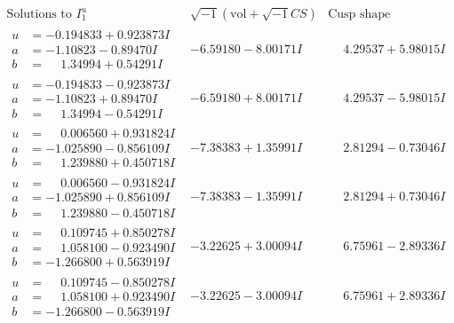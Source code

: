 \documentclass[1p]{elsarticle_modified}
\theoremstyle{definition}
\newcommand{\I}{\sqrt{-1}}
\begin{document}
$$\begin{array}{c|c|c}  
\text{Solutions to }I^u_{1}& \I (\text{vol} + \sqrt{-1}CS) & \text{Cusp shape}\\
 \hline 
\begin{aligned}
u &= -0.194833 + 0.923873 I \\
a &= -1.10823 - 0.89470 I \\
b &= \phantom{-}1.34994 + 0.54291 I\end{aligned}
 & -6.59180 - 8.00171 I & \phantom{-}4.29537 + 5.98015 I \\ \hline\begin{aligned}
u &= -0.194833 - 0.923873 I \\
a &= -1.10823 + 0.89470 I \\
b &= \phantom{-}1.34994 - 0.54291 I\end{aligned}
 & -6.59180 + 8.00171 I & \phantom{-}4.29537 - 5.98015 I \\ \hline\begin{aligned}
u &= \phantom{-}0.006560 + 0.931824 I \\
a &= -1.025890 - 0.856109 I \\
b &= \phantom{-}1.239880 + 0.450718 I\end{aligned}
 & -7.38383 + 1.35991 I & \phantom{-}2.81294 - 0.73046 I \\ \hline\begin{aligned}
u &= \phantom{-}0.006560 - 0.931824 I \\
a &= -1.025890 + 0.856109 I \\
b &= \phantom{-}1.239880 - 0.450718 I\end{aligned}
 & -7.38383 - 1.35991 I & \phantom{-}2.81294 + 0.73046 I \\ \hline\begin{aligned}
u &= \phantom{-}0.109745 + 0.850278 I \\
a &= \phantom{-}1.058100 - 0.923490 I \\
b &= -1.266800 + 0.563919 I\end{aligned}
 & -3.22625 + 3.00094 I & \phantom{-}6.75961 - 2.89336 I \\ \hline\begin{aligned}
u &= \phantom{-}0.109745 - 0.850278 I \\
a &= \phantom{-}1.058100 + 0.923490 I \\
b &= -1.266800 - 0.563919 I\end{aligned}
 & -3.22625 - 3.00094 I & \phantom{-}6.75961 + 2.89336 I \\ \hline\begin{aligned}

\end{aligned}
\end{array}$$
\end{document}
